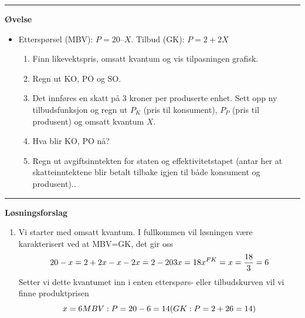 \documentclass[
  letterpaper,
  DIV=11,
  numbers=noendperiod]{scrartcl}
\providecommand{\tightlist}{%
  \setlength{\itemsep}{0pt}\setlength{\parskip}{0pt}}\usepackage{longtable,booktabs,array}
\begin{document}
\begin{center}\rule{0.5\linewidth}{0.5pt}\end{center}

\textbf{Øvelse}

\begin{itemize}
\tightlist
\item
  Etterspørsel (MBV): \(P = 20 – X\). Tilbud (GK): \(P = 2 + 2X\)

  \begin{enumerate}
  \def\labelenumi{\alph{enumi}.}
  \tightlist
  \item
    Finn likevektspris, omsatt kvantum og vis tilpasningen grafisk.
  \item
    Regn ut KO, PO og SO.
  \item
    Det innføres en skatt på 3 kroner per produserte enhet. Sett opp ny
    tilbudsfunksjon og regn ut \(P_K\) (pris til konsument), \(P_P\)
    (pris til produsent) og omsatt kvantum \(X\).
  \item
    Hva blir KO, PO nå?
  \item
    Regn ut avgiftsinntekten for staten og effektivitetstapet (antar her
    at skatteinntektene blir betalt tilbake igjen til både konsument og
    produsent)..
  \end{enumerate}
\end{itemize}

\begin{center}\rule{0.5\linewidth}{0.5pt}\end{center}

\textbf{Løsningsforslag}

\begin{enumerate}
\def\labelenumi{\alph{enumi})}
\tightlist
\item
  Vi starter med omsatt kvantum. I fullkommen vil løsningen være
  karakterisert ved at MBV=GK, det gir oss \begin{equation*}
  20-x=2+2x \\
  -x-2x =2-20 \\
  3x   =18 \\
  x^{FK}=x =\frac{18}{3} = 6
  \end{equation*} Setter vi dette kvantumet inn i enten etterspørs-
  eller tilbudskurven vil vi finne produktprisen \begin{equation*}
  x = 6 \\
  MBV: P = 20-6=14 \\
  (GK: P = 2+26 = 14)
  \end{equation*}
\end{enumerate}
\end{document}
